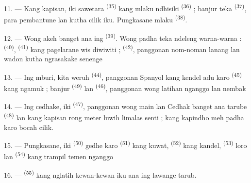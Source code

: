 11. --- Kang kapisan, iki sawetara 
\textsuperscript{(35)} kang mlaku ndhisiki 
\textsuperscript{(36)} ; banjur teka 
\textsuperscript{(37)}, para pembantune lan 
kutha cilik iku. Pungkasane mlaku 
\textsuperscript{(38)}.

\VUsaut{5.0mm}
\VUsaut{3.6mm}

12. --- Wong akeh banget ana ing 
\textsuperscript{(39)}. Wong padha teka ndeleng warna-warna
 :  \textsuperscript{(40)},
 \textsuperscript{(41)} kang pagelarane wis diwiwiti ;
 \textsuperscript{(42)}, panggonan nom-noman lanang
lan wadon kutha ngrasakake senenge 

13. --- Ing mburi, kita weruh  \textsuperscript{(44)},
panggonan  Spanyol kang kendel adu karo
 \textsuperscript{(45)} kang ngamuk ; banjur
 \textsuperscript{(49)} lan  \textsuperscript{(46)}, panggonan wong latihan nganggo
 lan nembak 

14. --- Ing cedhake, iki 
\textsuperscript{(47)}, panggonan wong main  lan
 Cedhak banget ana tarube 
\textsuperscript{(48)} lan   kang
kapisan rong meter luwih limalas senti ; kang kapindho meh padha
karo bocah cilik.

15. --- Pungkasane, iki  \textsuperscript{(50)}
gedhe karo  
\textsuperscript{(51)} kang  kuwat, 
\textsuperscript{(52)} kang  kandel, 
\textsuperscript{(53)} loro lan  \textsuperscript{(54)}
kang trampil temen nganggo 

16. ---  \textsuperscript{(55)} kang nglatih
kewan-kewan iku ana ing lawange tarub.

\VUsaut{6.0mm}
\VUfilet{22mm}

